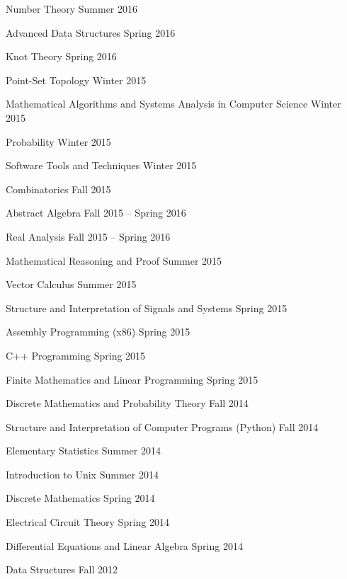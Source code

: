 \documentclass[letterpaper,MMMyyyy,nonstopmode]{simpleresumecv}
\begin{document}
\begin{Body}
\BigGap

\BulletItem
Number Theory
\hfill Summer 2016

\BulletItem
Advanced Data Structures
\hfill Spring 2016

\BulletItem
Knot Theory
\hfill Spring 2016

\BulletItem
Point-Set Topology
\hfill Winter 2015

\BulletItem
Mathematical Algorithms and Systems Analysis in Computer Science
\hfill Winter 2015

\BulletItem
Probability
\hfill Winter 2015

\BulletItem
Software Tools and Techniques
\hfill Winter 2015

\BulletItem
Combinatorics
\hfill Fall 2015

\BulletItem
Abstract Algebra
\hfill Fall 2015 -- Spring 2016

\BulletItem
Real Analysis
\hfill Fall 2015 -- Spring 2016

\BigGap

\BulletItem
Mathematical Reasoning and Proof
\hfill Summer 2015

\BulletItem
Vector Calculus
\hfill Summer 2015

\BulletItem
Structure and Interpretation of Signals and Systems
\hfill Spring 2015

\BulletItem
Assembly Programming (x86)
\hfill Spring 2015

\BulletItem
C++ Programming
\hfill Spring 2015

\BulletItem
Finite Mathematics and Linear Programming
\hfill Spring 2015

\BulletItem
Discrete Mathematics and Probability Theory
\hfill Fall 2014

\BulletItem
Structure and Interpretation of Computer Programs (Python)
\hfill Fall 2014

\BigGap

\BulletItem
Elementary Statistics
\hfill Summer 2014

\BulletItem
Introduction to Unix
\hfill Summer 2014

\BulletItem
Discrete Mathematics
\hfill Spring 2014

\BulletItem
Electrical Circuit Theory
\hfill Spring 2014

\BulletItem
Differential Equations and Linear Algebra
\hfill Spring 2014

\BulletItem
Data Structures
\hfill Fall 2012


\end{Body}
\end{document}
